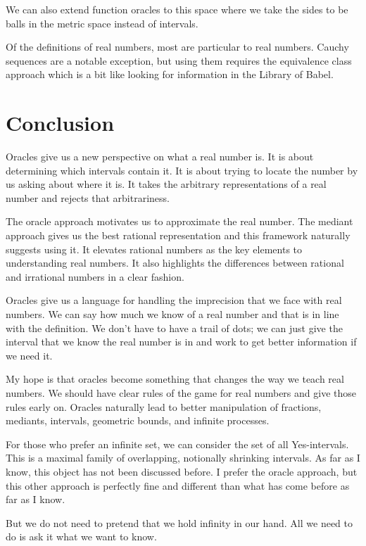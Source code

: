 \documentclass[12pt]{article}
\theoremstyle{remark}
\begin{document}
We can also extend function oracles to this space where we take the sides to be balls in the metric space instead of intervals. 

Of the definitions of real numbers, most are particular to real numbers. Cauchy sequences are a notable exception, but using them requires the equivalence class approach which is a bit like looking for information in the Library of Babel. 

\section{Conclusion}

Oracles give us a new perspective on what a real number is. It is about determining which intervals contain it. It is about trying to locate the number by us asking about where it is. It takes the arbitrary representations of a real number and rejects that arbitrariness. 

The oracle approach motivates us to approximate the real number. The mediant approach gives us the best rational representation and this framework naturally suggests using it. It elevates rational numbers as the key elements to understanding real numbers. It also highlights the differences between rational and irrational numbers in a clear fashion. 

Oracles give us a language for handling the imprecision that we face with real numbers. We can say how much we know of a real number and that is in line with the definition. We don't have to have a trail of dots; we can just give the interval that we know the real number is in and work to get better information if we need it. 

My hope is that oracles become something that changes the way we teach real numbers. We should have clear rules of the game for real numbers and give those rules early on. Oracles naturally lead to better manipulation of fractions, mediants, intervals, geometric bounds, and infinite processes. 

For those who prefer an infinite set, we can consider the set of all Yes-intervals. This is a maximal family of overlapping, notionally shrinking intervals. As far as I know, this object has not been discussed before. I prefer the oracle approach, but this other approach is perfectly fine and different than what has come before as far as I know. 

But we do not need to pretend that we hold infinity in our hand. All we need to do is ask it what we want to know. 

\medskip

\printbibliography
\end{document}
